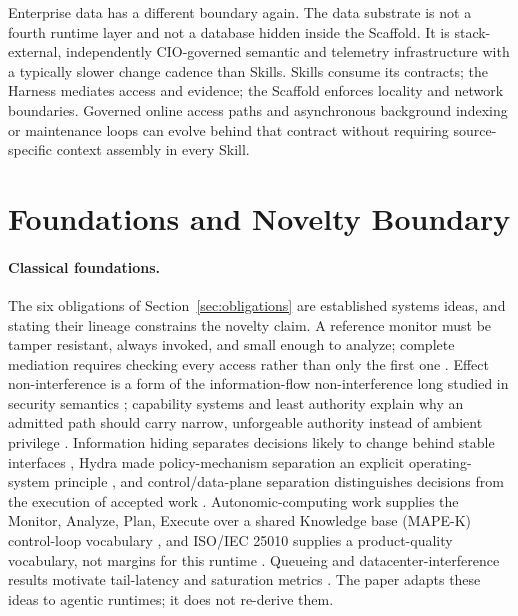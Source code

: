 \documentclass[11pt]{article}
\begin{document}
Enterprise data has a different boundary again. The data substrate is not a fourth runtime layer and not a database hidden inside the Scaffold. It is stack-external, independently CIO-governed semantic and telemetry infrastructure with a typically slower change cadence than Skills. Skills consume its contracts; the Harness mediates access and evidence; the Scaffold enforces locality and network boundaries. Governed online access paths and asynchronous background indexing or maintenance loops can evolve behind that contract without requiring source-specific context assembly in every Skill.

\section{Foundations and Novelty Boundary}
\label{sec:related}

\paragraph{Classical foundations.}
The six obligations of Section~\ref{sec:obligations} are established systems ideas, and stating their lineage constrains the novelty claim. A reference monitor must be tamper resistant, always invoked, and small enough to analyze; complete mediation requires checking every access rather than only the first one \cite{anderson1972reference,saltzer1975protection}. Effect non-interference is a form of the information-flow non-interference long studied in security semantics \cite{goguen1982noninterference}; capability systems and least authority explain why an admitted path should carry narrow, unforgeable authority instead of ambient privilege \cite{miller2003capability}. Information hiding separates decisions likely to change behind stable interfaces \cite{parnas1972criteria}, Hydra made policy-mechanism separation an explicit operating-system principle \cite{levin1975hydra}, and control/data-plane separation distinguishes decisions from the execution of accepted work \cite{kreutz2015sdn}. Autonomic-computing work supplies the Monitor, Analyze, Plan, Execute over a shared Knowledge base (MAPE-K) control-loop vocabulary \cite{kephart2003autonomic,ibm2006autonomic}, and ISO/IEC 25010 supplies a product-quality vocabulary, not margins for this runtime \cite{iso25010}. Queueing and datacenter-interference results motivate tail-latency and saturation metrics \cite{kleinrock1975queueing,mars2011bubbleup,dean2013tail}. The paper adapts these ideas to agentic runtimes; it does not re-derive them.
\end{document}
